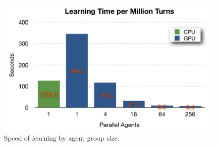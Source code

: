 \begin{figure}[hbtp]
\center
\includegraphics[scale=0.8]{fig17}
\caption{Speed of learning by agent group size.}
\label{fig:time_per_million}
\end{figure}

